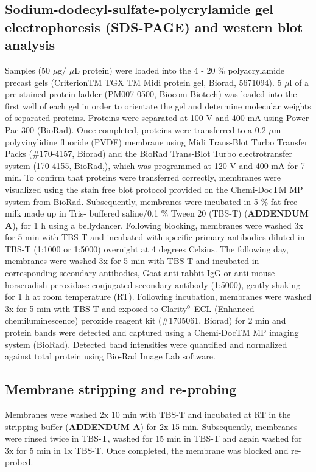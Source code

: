 \subsection{Sodium-dodecyl-sulfate-polycrylamide gel electrophoresis (SDS-PAGE) and western blot analysis}\label{sec:SDS_PAGE}
Samples (50 $\mu$g/ $\mu$L protein) were loaded into the 4 - 20 \% polyacrylamide precast gels (CriterionTM TGX TM Midi protein gel, Biorad, 5671094). 5 $\mu$l of a pre-stained protein ladder (PM007-0500, Biocom Biotech) was loaded into the first well of each gel in order to orientate the gel and determine molecular weights of separated proteins. Proteins were separated at 100 V and 400 mA using Power Pac 300 (BioRad). Once completed, proteins were transferred to a 0.2 $\mu$m polyvinylidine fluoride (PVDF) membrane using Midi Trans-Blot Turbo Transfer Packs (\#170-4157, Biorad) and the BioRad Trans-Blot Turbo electrotransfer system (170-4155, BioRad,), which was programmed at 120 V and 400 mA for 7 min. To confirm that proteins were transferred correctly, membranes were visualized using the stain free blot protocol provided on the Chemi-DocTM MP system from BioRad. Subsequently, membranes were incubated in 5 \% fat-free milk made up in Tris- buffered saline/0.1 \% Tween 20 (TBS-T) (\textbf{ADDENDUM A}), for 1 h using a bellydancer. Following blocking, membranes were washed 3x for 5 min with TBS-T and incubated with specific primary antibodies diluted in TBS-T (1:1000 or 1:5000) overnight at 4 degrees Celsius. The following day, membranes were washed 3x for 5 min with TBS-T and incubated in corresponding secondary antibodies, Goat anti-rabbit IgG or anti-mouse horseradish peroxidase conjugated secondary antibody (1:5000), gently shaking for 1 h at room temperature (RT). Following incubation, membranes were washed 3x for 5 min with TBS-T and exposed to Clarity${\textsuperscript{\tiny{\textregistered}}}$ ECL (Enhanced chemiluminescence) peroxide reagent kit (\#1705061, Biorad) for 2 min and protein bands were detected and captured using a Chemi-DocTM MP imaging system (BioRad). Detected band intensities were quantified and normalized against total protein using Bio-Rad Image Lab software.

\subsection{Membrane stripping and re-probing}
Membranes were washed 2x 10 min with TBS-T and incubated at RT in the stripping buffer (\textbf{ADDENDUM A}) for 2x 15 min. Subsequently, membranes were rinsed twice in TBS-T, washed for 15 min in TBS-T and again washed for 3x for 5 min in 1x TBS-T. Once completed, the membrane was blocked and re-probed.

